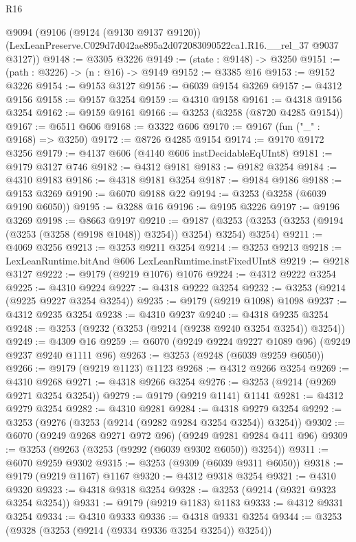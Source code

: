 \begin{lexlean}{R16}
\begin{coremodule}
  @9094
    (@9106
      (@9124 (@9130 @9137 @9120))
      (LexLeanPreserve.C029d7d042ae895a2d072083090522ca1.R16.__rel_37 @9037 @3127))
@9148 := @3305 @3226
@9149 := (state : @9148) -> @3250
@9151 := (path : @3226) -> (n : @16) -> @9149
@9152 := @3385 @16
@9153 := @9152 @3226
@9154 := @9153 @3127
@9156 := @6039 @9154 @3269
@9157 := @4312 @9156
@9158 := @9157 @3254
@9159 := @4310 @9158
@9161 := @4318 @9156 @3254
@9162 := @9159 @9161
@9166 := @3253 (@3258 (@8720 @4285 @9154))
@9167 := @6511 @606
@9168 := @3322 @606
@9170 := @9167 (fun ("_" : @9168) => @3250)
@9172 := @8726 @4285 @9154
@9174 := @9170 @9172 @3256
@9179 := @4137 @606 (@4140 @606 instDecidableEqUInt8)
@9181 := @9179 @3127 @746
@9182 := @4312 @9181
@9183 := @9182 @3254
@9184 := @4310 @9183
@9186 := @4318 @9181 @3254
@9187 := @9184 @9186
@9188 := @9153 @3269
@9190 := @6070 @9188 @22
@9194 := @3253 (@3258 (@6039 @9190 @6050))
@9195 := @3288 @16
@9196 := @9195 @3226
@9197 := @9196 @3269
@9198 := @8663 @9197
@9210 := @9187 (@3253 (@3253 (@3253 (@9194 (@3253 (@3258 (@9198 @1048)) @3254)) @3254) @3254) @3254)
@9211 := @4069 @3256
@9213 := @3253 @9211 @3254
@9214 := @3253 @9213
@9218 := LexLeanRuntime.bitAnd @606 LexLeanRuntime.instFixedUInt8
@9219 := @9218 @3127
@9222 := @9179 (@9219 @1076) @1076
@9224 := @4312 @9222 @3254
@9225 := @4310 @9224
@9227 := @4318 @9222 @3254
@9232 := @3253 (@9214 (@9225 @9227 @3254 @3254))
@9235 := @9179 (@9219 @1098) @1098
@9237 := @4312 @9235 @3254
@9238 := @4310 @9237
@9240 := @4318 @9235 @3254
@9248 := @3253 (@9232 (@3253 (@9214 (@9238 @9240 @3254 @3254)) @3254))
@9249 := @4309 @16
@9259 := @6070 (@9249 @9224 @9227 @1089 @96) (@9249 @9237 @9240 @1111 @96)
@9263 := @3253 (@9248 (@6039 @9259 @6050))
@9266 := @9179 (@9219 @1123) @1123
@9268 := @4312 @9266 @3254
@9269 := @4310 @9268
@9271 := @4318 @9266 @3254
@9276 := @3253 (@9214 (@9269 @9271 @3254 @3254))
@9279 := @9179 (@9219 @1141) @1141
@9281 := @4312 @9279 @3254
@9282 := @4310 @9281
@9284 := @4318 @9279 @3254
@9292 := @3253 (@9276 (@3253 (@9214 (@9282 @9284 @3254 @3254)) @3254))
@9302 := @6070 (@9249 @9268 @9271 @972 @96) (@9249 @9281 @9284 @411 @96)
@9309 := @3253 (@9263 (@3253 (@9292 (@6039 @9302 @6050)) @3254))
@9311 := @6070 @9259 @9302
@9315 := @3253 (@9309 (@6039 @9311 @6050))
@9318 := @9179 (@9219 @1167) @1167
@9320 := @4312 @9318 @3254
@9321 := @4310 @9320
@9323 := @4318 @9318 @3254
@9328 := @3253 (@9214 (@9321 @9323 @3254 @3254))
@9331 := @9179 (@9219 @1183) @1183
@9333 := @4312 @9331 @3254
@9334 := @4310 @9333
@9336 := @4318 @9331 @3254
@9344 := @3253 (@9328 (@3253 (@9214 (@9334 @9336 @3254 @3254)) @3254))

\end{coremodule}
\end{lexlean}
